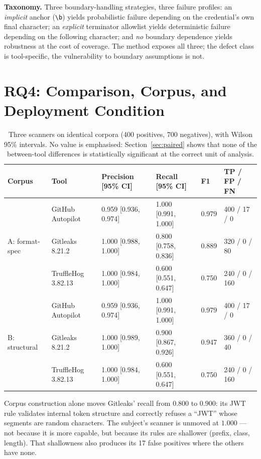 \documentclass[journal]{IEEEtran}
\begin{document}
\textbf{Taxonomy.} Three boundary-handling strategies, three failure profiles: an \emph{implicit} anchor (\verb|\b|) yields probabilistic failure depending on the credential's own final character; an \emph{explicit} terminator allowlist yields deterministic failure depending on the following character; and \emph{no} boundary dependence yields robustness at the cost of coverage. The method exposes all three; the defect class is tool-specific, the vulnerability to boundary assumptions is not.

\section{RQ4: Comparison, Corpus, and Deployment Condition}
\label{sec:rq4}

\begin{table}[t]
\centering
\caption{Three scanners on identical corpora (400 positives, 700 negatives), with Wilson 95\% intervals. No value is emphasised: Section~\ref{sec:paired} shows that none of the between-tool differences is statistically significant at the correct unit of analysis.}
\label{tab:comparative}
\small
\setlength{\tabcolsep}{5pt}
\begin{tabular}{@{}llllll@{}}
\toprule
Corpus & Tool & Precision [95\% CI] & Recall [95\% CI] & F1 & TP / FP / FN \\
\midrule
\multirow{3}{*}{A: format-spec}
 & GitHub Autopilot & 0.959 [0.936, 0.974] & 1.000 [0.991, 1.000] & 0.979 & 400 / 17 / 0 \\
 & Gitleaks 8.21.2 & 1.000 [0.988, 1.000] & 0.800 [0.758, 0.836] & 0.889 & 320 / 0 / 80 \\
 & TruffleHog 3.82.13 & 1.000 [0.984, 1.000] & 0.600 [0.551, 0.647] & 0.750 & 240 / 0 / 160 \\
\midrule
\multirow{3}{*}{B: structural}
 & GitHub Autopilot & 0.959 [0.936, 0.974] & 1.000 [0.991, 1.000] & 0.979 & 400 / 17 / 0 \\
 & Gitleaks 8.21.2 & 1.000 [0.989, 1.000] & 0.900 [0.867, 0.926] & 0.947 & 360 / 0 / 40 \\
 & TruffleHog 3.82.13 & 1.000 [0.984, 1.000] & 0.600 [0.551, 0.647] & 0.750 & 240 / 0 / 160 \\
\bottomrule
\end{tabular}
\end{table}

Corpus construction alone moves Gitleaks' recall from $0.800$ to $0.900$: its JWT rule validates internal token structure and correctly refuses a ``JWT'' whose segments are random characters. The subject's scanner is unmoved at $1.000$ --- not because it is more capable, but because its rules are shallower (prefix, class, length). That shallowness also produces its 17 false positives where the others have none.
\end{document}
